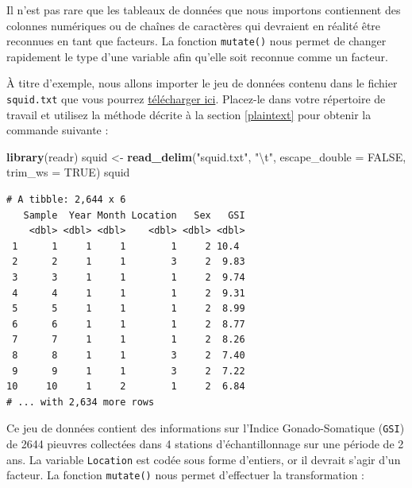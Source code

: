 \documentclass[
  a4paper,
]{article}
\newenvironment{Shaded}{\begin{snugshade}}{\end{snugshade}}
\newcommand{\CharTok}[1]{\textcolor[rgb]{0.57,0.30,0.62}{#1}}
\newcommand{\DataTypeTok}[1]{\textcolor[rgb]{0.00,0.34,0.68}{#1}}
\newcommand{\KeywordTok}[1]{\textcolor[rgb]{0.12,0.11,0.11}{\textbf{#1}}}
\newcommand{\NormalTok}[1]{\textcolor[rgb]{0.12,0.11,0.11}{#1}}
\newcommand{\OperatorTok}[1]{\textcolor[rgb]{0.12,0.11,0.11}{#1}}
\newcommand{\OtherTok}[1]{\textcolor[rgb]{0.00,0.43,0.16}{#1}}
\newcommand{\StringTok}[1]{\textcolor[rgb]{0.75,0.01,0.01}{#1}}
\begin{document}
Il n'est pas rare que les tableaux de données que nous importons contiennent des colonnes numériques ou de chaînes de caractères qui devraient en réalité être reconnues en tant que facteurs. La fonction \texttt{mutate()} nous permet de changer rapidement le type d'une variable afin qu'elle soit reconnue comme un facteur.

À titre d'exemple, nous allons importer le jeu de données contenu dans le fichier \texttt{squid.txt} que vous pourrez \href{data/squid.txt}{télécharger ici}. Placez-le dans votre répertoire de travail et utilisez la méthode décrite à la section \ref{plaintext} pour obtenir la commande suivante :

\begin{Shaded}
\begin{Highlighting}[]
\KeywordTok{library}\NormalTok{(readr)}
\NormalTok{squid <-}\StringTok{ }\KeywordTok{read_delim}\NormalTok{(}\StringTok{"squid.txt"}\NormalTok{, }\StringTok{"}\CharTok{\textbackslash{}t}\StringTok{"}\NormalTok{, }\DataTypeTok{escape_double =} \OtherTok{FALSE}\NormalTok{, }\DataTypeTok{trim_ws =} \OtherTok{TRUE}\NormalTok{)}
\NormalTok{squid}
\end{Highlighting}
\end{Shaded}

\begin{verbatim}
# A tibble: 2,644 x 6
   Sample  Year Month Location   Sex   GSI
    <dbl> <dbl> <dbl>    <dbl> <dbl> <dbl>
 1      1     1     1        1     2 10.4 
 2      2     1     1        3     2  9.83
 3      3     1     1        1     2  9.74
 4      4     1     1        1     2  9.31
 5      5     1     1        1     2  8.99
 6      6     1     1        1     2  8.77
 7      7     1     1        1     2  8.26
 8      8     1     1        3     2  7.40
 9      9     1     1        3     2  7.22
10     10     1     2        1     2  6.84
# ... with 2,634 more rows
\end{verbatim}

Ce jeu de données contient des informations sur l'Indice Gonado-Somatique (\texttt{GSI}) de 2644 pieuvres collectées dans 4 stations d'échantillonnage sur une période de 2 ans. La variable \texttt{Location} est codée sous forme d'entiers, or il devrait s'agir d'un facteur. La fonction \texttt{mutate()} nous permet d'effectuer la transformation :

\begin{Shaded}
\end{Shaded}
\end{document}
